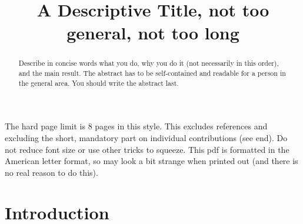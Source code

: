 \documentclass[letterpaper]{article}
\title{A Descriptive Title, not too general, not too long}
\newcommand{\mypar}[1]{{\bf #1.}}
\begin{document}
%
\maketitle
%

The hard page limit is 8 pages in this style. This excludes references and excluding the short, mandatory part on individual contributions (see end). Do not reduce font size
or use other tricks to squeeze. This pdf is formatted in the American letter format, so may look a bit strange when printed out (and there is no real reason to do this).

\begin{abstract}
Describe in concise words what you do, why you do it (not necessarily
in this order), and the main result. The abstract has to be
self-contained and readable for a person in the general area. You
should write the abstract last.
\end{abstract}

\section{Introduction}\label{sec:intro}

\end{document}
